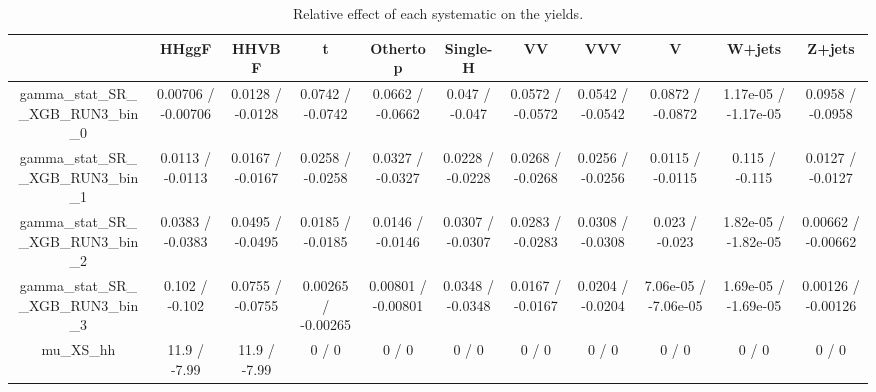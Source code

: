 \documentclass[10pt]{article}
\begin{document}
\begin{table}[htbp]
\begin{center}
\begin{tabular}{|c|c|c|c|c|c|c|c|c|c|c|}
\hline 
      & HHggF      & HHVBF      & t      & Othertop      & Single-H      & VV      & VVV      & V      & W+jets      & Z+jets \\ 
\hline 
  gamma_stat_SR__XGB_RUN3_bin_0 & 0.00706 / -0.00706 & 0.0128 / -0.0128 & 0.0742 / -0.0742 & 0.0662 / -0.0662 & 0.047 / -0.047 & 0.0572 / -0.0572 & 0.0542 / -0.0542 & 0.0872 / -0.0872 & 1.17e-05 / -1.17e-05 & 0.0958 / -0.0958 \\ 
  gamma_stat_SR__XGB_RUN3_bin_1 & 0.0113 / -0.0113 & 0.0167 / -0.0167 & 0.0258 / -0.0258 & 0.0327 / -0.0327 & 0.0228 / -0.0228 & 0.0268 / -0.0268 & 0.0256 / -0.0256 & 0.0115 / -0.0115 & 0.115 / -0.115 & 0.0127 / -0.0127 \\ 
  gamma_stat_SR__XGB_RUN3_bin_2 & 0.0383 / -0.0383 & 0.0495 / -0.0495 & 0.0185 / -0.0185 & 0.0146 / -0.0146 & 0.0307 / -0.0307 & 0.0283 / -0.0283 & 0.0308 / -0.0308 & 0.023 / -0.023 & 1.82e-05 / -1.82e-05 & 0.00662 / -0.00662 \\ 
  gamma_stat_SR__XGB_RUN3_bin_3 & 0.102 / -0.102 & 0.0755 / -0.0755 & 0.00265 / -0.00265 & 0.00801 / -0.00801 & 0.0348 / -0.0348 & 0.0167 / -0.0167 & 0.0204 / -0.0204 & 7.06e-05 / -7.06e-05 & 1.69e-05 / -1.69e-05 & 0.00126 / -0.00126 \\ 
  mu_XS_hh & 11.9 / -7.99 & 11.9 / -7.99 & 0 / 0 & 0 / 0 & 0 / 0 & 0 / 0 & 0 / 0 & 0 / 0 & 0 / 0 & 0 / 0 \\ 
\hline 
\end{tabular} 
\caption{Relative effect of each systematic on the yields.} 
\end{center} 
\end{table} 
\end{document}

